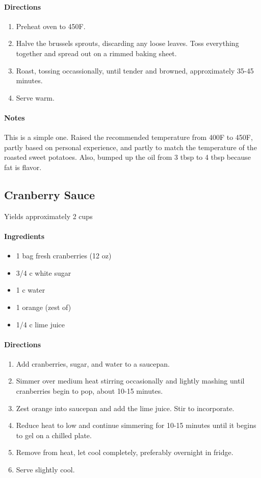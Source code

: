 \documentclass[12pt]{article}
\newenvironment*{ingredients}
	{
		\paragraph*{Ingredients}
		\begin{itemize}
	}
	{
		\end{itemize}
	}
\newenvironment*{directions}
	{
		\paragraph*{Directions}
		\begin{enumerate}
	}
	{
		\end{enumerate}
	}
\newenvironment*{notes}
	{
		\paragraph*{Notes}
		\begin{adjustwidth}{1cm}{}
	}
	{
		\end{adjustwidth}
	}
\begin{document}
	\begin{directions}
		\item Preheat oven to 450F.
		\item Halve the brussels sprouts, discarding any loose leaves. Toss everything together and spread out on a rimmed baking sheet.
		\item Roast, tossing occassionally, until tender and browned, approximately 35-45 minutes.
		\item Serve warm.
	\end{directions}
	
	\begin{notes}
		This is a simple one. Raised the recommended temperature from 400F to 450F, partly based on personal experience, and partly to match the temperature of the roasted sweet potatoes. Also, bumped up the oil from 3 tbsp to 4 tbsp because fat is flavor.
	\end{notes}
	
	\newpage
	
	\subsection{Cranberry Sauce}\label{sec:cranberry_sauce}
	Yields approximately 2 cups
	
	\begin{ingredients}
		\item 1 bag fresh cranberries (12 oz)
		\item 3/4 c white sugar
		\item 1 c water
		\item 1 orange (zest of)
		\item 1/4 c lime juice
	\end{ingredients}
	
	\begin{directions}
		\item Add cranberries, sugar, and water to a saucepan.
		\item Simmer over medium heat stirring occasionally and lightly mashing until cranberries begin to pop, about 10-15 minutes.
		\item Zest orange into saucepan and add the lime juice. Stir to incorporate.
		\item Reduce heat to low and continue simmering for 10-15 minutes until it begins to gel on a chilled plate.
		\item Remove from heat, let cool completely, preferably overnight in fridge.
		\item Serve slightly cool.
	\end{directions}
	
\end{document}
